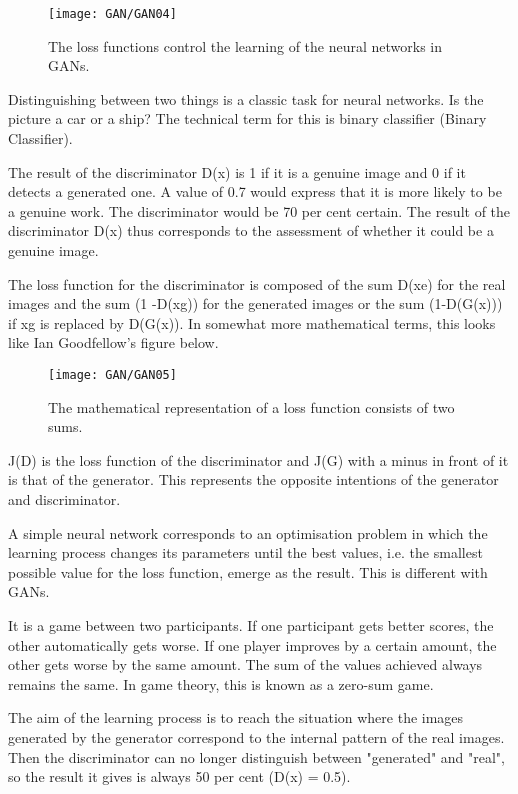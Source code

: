 \begin{figure}
  \texttt{[image: GAN/GAN04]}
  \caption{The loss functions control the learning of the neural networks in GANs.} 
  \label{GAN04}
\end{figure}


Distinguishing between two things is a classic task for neural networks. Is the picture a car or a ship? The technical term for this is binary classifier (Binary Classifier).

The result of the discriminator D(x) is 1 if it is a genuine image and 0 if it detects a generated one. A value of 0.7 would express that it is more likely to be a genuine work. The discriminator would be 70 per cent certain. The result of the discriminator D(x) thus corresponds to the assessment of whether it could be a genuine image.

The loss function for the discriminator is composed of the sum D(xe) for the real images and the sum (1 -D(xg)) for the generated images or the sum (1-D(G(x))) if xg is replaced by D(G(x)). In somewhat more mathematical terms, this looks like Ian Goodfellow's figure below.

\begin{figure}
  \texttt{[image: GAN/GAN05]}
  \caption{The mathematical representation of a loss function consists of two sums.} 
  \label{GAN05}
\end{figure}

J(D) is the loss function of the discriminator and J(G) with a minus in front of it is that of the generator. This represents the opposite intentions of the generator and discriminator.

A simple neural network corresponds to an optimisation problem in which the learning process changes its parameters until the best values, i.e. the smallest possible value for the loss function, emerge as the result. This is different with GANs.

It is a game between two participants. If one participant gets better scores, the other automatically gets worse. If one player improves by a certain amount, the other gets worse by the same amount. The sum of the values achieved always remains the same. In game theory, this is known as a zero-sum game.

The aim of the learning process is to reach the situation where the images generated by the generator correspond to the internal pattern of the real images. Then the discriminator can no longer distinguish between "generated" and "real", so the result it gives is always 50 per cent (D(x) = 0.5).

